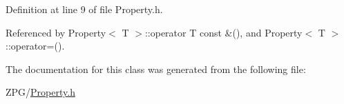 Definition at line 9 of file Property.\+h.



Referenced by Property$<$ T $>$\+::operator T const \&(), and Property$<$ T $>$\+::operator=().



The documentation for this class was generated from the following file\+:\begin{DoxyCompactItemize}
\item 
Z\+P\+G/\mbox{\hyperlink{Property_8h}{Property.\+h}}\end{DoxyCompactItemize}

